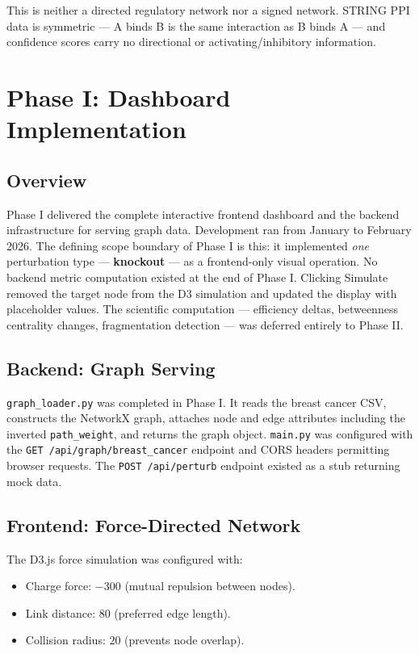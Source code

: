 \documentclass[12pt,a4paper]{report}
\begin{document}
This is neither a directed regulatory network nor a signed network. STRING PPI data is symmetric — A binds B is the same interaction as B binds A — and confidence scores carry no directional or activating/inhibitory information.

\chapter{Phase I: Dashboard Implementation}

\section{Overview}

Phase I delivered the complete interactive frontend dashboard and the backend infrastructure for serving graph data. Development ran from January to February 2026. The defining scope boundary of Phase I is this: it implemented \textit{one} perturbation type — \textbf{knockout} — as a frontend-only visual operation. No backend metric computation existed at the end of Phase I. Clicking Simulate removed the target node from the D3 simulation and updated the display with placeholder values. The scientific computation — efficiency deltas, betweenness centrality changes, fragmentation detection — was deferred entirely to Phase II.

\section{Backend: Graph Serving}

\texttt{graph\_loader.py} was completed in Phase I. It reads the breast cancer CSV, constructs the NetworkX graph, attaches node and edge attributes including the inverted \texttt{path\_weight}, and returns the graph object. \texttt{main.py} was configured with the \texttt{GET /api/graph/breast\_cancer} endpoint and CORS headers permitting browser requests. The \texttt{POST /api/perturb} endpoint existed as a stub returning mock data.

\section{Frontend: Force-Directed Network}

The D3.js force simulation was configured with:
\begin{itemize}
  \item Charge force: $-300$ (mutual repulsion between nodes).
  \item Link distance: $80$ (preferred edge length).
  \item Collision radius: $20$ (prevents node overlap).
\end{itemize}
\end{document}
